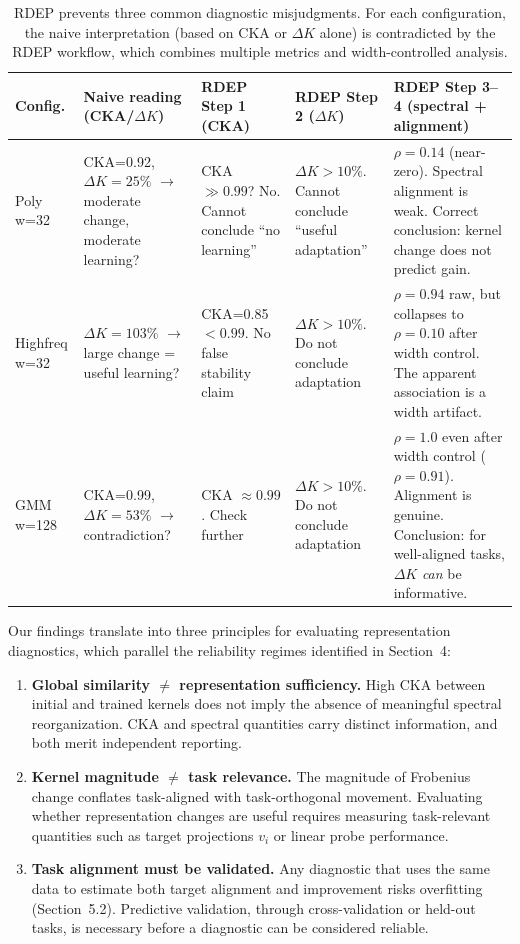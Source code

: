 \documentclass[10pt]{article}
\begin{document}
\begin{table}[t]
\centering\small
\caption{RDEP prevents three common diagnostic misjudgments.  For each configuration, the naive interpretation (based on CKA or $\Delta K$ alone) is contradicted by the RDEP workflow, which combines multiple metrics and width-controlled analysis.}
\label{tab:rdeep_cases}
\begin{tabular}{p{2cm}p{2.2cm}p{2.2cm}p{2.2cm}p{2.2cm}}
\toprule
Config. & Naive reading (CKA/$\Delta K$) & RDEP Step 1 (CKA) & RDEP Step 2 ($\Delta K$) & RDEP Step 3--4 (spectral + alignment) \\
\midrule
Poly w=32 & CKA=0.92, $\Delta K=25\%$ $\rightarrow$ moderate change, moderate learning? & CKA $\gg 0.99$? No. Cannot conclude ``no learning'' & $\Delta K >10\%$. Cannot conclude ``useful adaptation'' & $\rho=0.14$ (near-zero). Spectral alignment is weak. Correct conclusion: kernel change does not predict gain. \\
\midrule
Highfreq w=32 & $\Delta K=103\%$ $\rightarrow$ large change = useful learning? & CKA=0.85 $<0.99$. No false stability claim & $\Delta K >10\%$. Do not conclude adaptation & $\rho=0.94$ raw, but collapses to $\rho=0.10$ after width control. The apparent association is a width artifact. \\
\midrule
GMM w=128 & CKA=0.99, $\Delta K=53\%$ $\rightarrow$ contradiction? & CKA $\approx 0.99$. Check further & $\Delta K >10\%$. Do not conclude adaptation & $\rho=1.0$ even after width control ($\rho=0.91$). Alignment is genuine. Conclusion: for well-aligned tasks, $\Delta K$ \emph{can} be informative. \\
\bottomrule
\end{tabular}
\end{table}

Our findings translate into three principles for evaluating representation diagnostics, which parallel the reliability regimes identified in Section~4:

\begin{enumerate}
    \item \textbf{Global similarity $\neq$ representation sufficiency.}  High CKA between initial and trained kernels does not imply the absence of meaningful spectral reorganization.  CKA and spectral quantities carry distinct information, and both merit independent reporting.
    \item \textbf{Kernel magnitude $\neq$ task relevance.}  The magnitude of Frobenius change conflates task-aligned with task-orthogonal movement.  Evaluating whether representation changes are useful requires measuring task-relevant quantities such as target projections $v_i$ or linear probe performance.
    \item \textbf{Task alignment must be validated.}  Any diagnostic that uses the same data to estimate both target alignment and improvement risks overfitting (Section~5.2).  Predictive validation, through cross-validation or held-out tasks, is necessary before a diagnostic can be considered reliable.
\end{enumerate}
\end{document}
